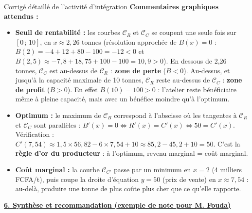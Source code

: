 \documentclass[11pt]{article}
\begin{document}
\begin{exoresolu}{Corrigé détaillé de l'activité d'intégration}
\textbf{Commentaires graphiques attendus :}
\begin{itemize}
    \item \textbf{Seuil de rentabilité :} les courbes $\mathcal{C}_R$ et $\mathcal{C}_C$ se coupent une seule fois sur $[0\,;\,10]$, en $x \approx 2,26$ tonnes (résolution approchée de $B(x)=0$ : $B(2) = -4 + 12 + 80 - 100 = -12 < 0$ et $B(2,5) \approx -7,8 + 18,75 + 100 - 100 = 10,9 > 0$). En dessous de 2,26 tonnes, $\mathcal{C}_C$ est au-dessus de $\mathcal{C}_R$ : \textbf{zone de perte} ($B<0$). Au-dessus, et jusqu'à la capacité maximale de 10 tonnes, $\mathcal{C}_R$ reste au-dessus de $\mathcal{C}_C$ : \textbf{zone de profit} ($B>0$). En effet $B(10) = 100 > 0$ : l'atelier reste bénéficiaire même à pleine capacité, mais avec un bénéfice moindre qu'à l'optimum.
    \item \textbf{Optimum :} le maximum de $\mathcal{C}_B$ correspond à l'abscisse où les tangentes à $\mathcal{C}_R$ et $\mathcal{C}_C$ sont parallèles : $B'(x)=0 \iff R'(x)=C'(x) \iff 50 = C'(x)$. Vérification : $C'(7,54) \approx 1,5 \times 56,82 - 6 \times 7,54 + 10 \approx 85,2 - 45,2 + 10 = 50$. C'est la \textbf{règle d'or du producteur} : à l'optimum, revenu marginal = coût marginal.
    \item \textbf{Coût marginal :} la courbe $\mathcal{C}_{C'}$ passe par un minimum en $x=2$ (4 milliers FCFA/t), puis coupe la droite d'équation $y = 50$ (prix de vente) en $x \approx 7,54$ : au-delà, produire une tonne de plus coûte plus cher que ce qu'elle rapporte.
\end{itemize}

\underline{\textbf{6. Synthèse et recommandation (exemple de note pour M. Fouda)}}


\end{exoresolu}
\end{document}
